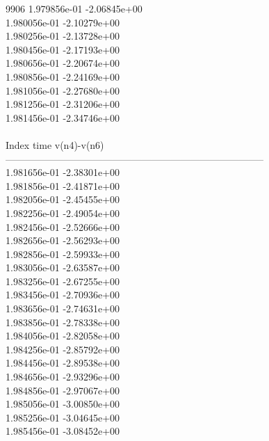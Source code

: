 9906	1.979856e-01	-2.06845e+00	\\ 	1.980056e-01	-2.10279e+00	\\ 	1.980256e-01	-2.13728e+00	\\ 	1.980456e-01	-2.17193e+00	\\ 	1.980656e-01	-2.20674e+00	\\ 	1.980856e-01	-2.24169e+00	\\ 	1.981056e-01	-2.27680e+00	\\ 	1.981256e-01	-2.31206e+00	\\ 	1.981456e-01	-2.34746e+00	\\ \hline
\\ \hline
Index   time            v(n4)-v(n6)     \\ \hline
--------------------------------------------------------------------------------\\ 	1.981656e-01	-2.38301e+00	\\ 	1.981856e-01	-2.41871e+00	\\ 	1.982056e-01	-2.45455e+00	\\ 	1.982256e-01	-2.49054e+00	\\ 	1.982456e-01	-2.52666e+00	\\ 	1.982656e-01	-2.56293e+00	\\ 	1.982856e-01	-2.59933e+00	\\ 	1.983056e-01	-2.63587e+00	\\ 	1.983256e-01	-2.67255e+00	\\ 	1.983456e-01	-2.70936e+00	\\ 	1.983656e-01	-2.74631e+00	\\ 	1.983856e-01	-2.78338e+00	\\ 	1.984056e-01	-2.82058e+00	\\ 	1.984256e-01	-2.85792e+00	\\ 	1.984456e-01	-2.89538e+00	\\ 	1.984656e-01	-2.93296e+00	\\ 	1.984856e-01	-2.97067e+00	\\ 	1.985056e-01	-3.00850e+00	\\ 	1.985256e-01	-3.04645e+00	\\ 	1.985456e-01	-3.08452e+00	\\ \hline
